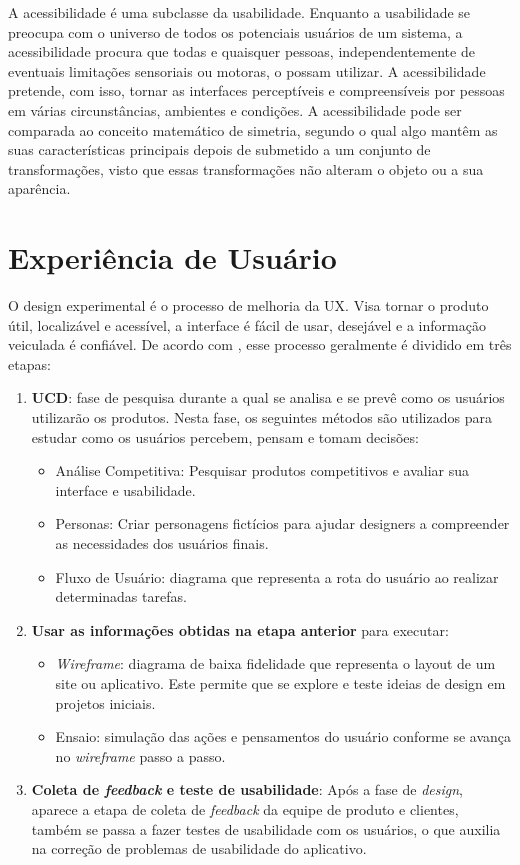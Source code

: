A acessibilidade é uma subclasse da usabilidade. Enquanto a usabilidade se preocupa com o universo de todos os potenciais usuários de um sistema, a acessibilidade procura que todas e quaisquer pessoas, independentemente de eventuais limitações sensoriais ou motoras, o possam utilizar. A acessibilidade pretende, com isso, tornar as interfaces perceptíveis e compreensíveis por pessoas em várias circunstâncias, ambientes e condições. A acessibilidade pode ser comparada ao conceito matemático de simetria, segundo o qual algo mantêm as suas características principais depois de submetido a um conjunto de transformações, visto que essas transformações não alteram o objeto ou a sua aparência. \cite{matos2021estudo} 
 
\section{Experiência de Usuário}
\label{Experiência_de_Usuário}

O design experimental é o processo de melhoria da \acf{UX}. Visa tornar o produto útil, localizável e acessível, a interface é fácil de usar, desejável e a informação veiculada é confiável. De acordo com \cite{brito2016usabilidade}, esse processo geralmente é dividido em três etapas:

\begin{enumerate}
    \item \textbf{\ac{UCD}}: fase de pesquisa durante a qual se analisa e se prevê como os usuários utilizarão os produtos. Nesta fase, os seguintes métodos são utilizados para estudar como os usuários percebem, pensam e tomam decisões:
    \begin{itemize}
        \item Análise Competitiva: Pesquisar produtos competitivos e avaliar sua interface e usabilidade. 
        \item Personas: Criar personagens fictícios para ajudar designers a compreender as necessidades dos usuários finais. 
        \item Fluxo de Usuário: diagrama que representa a rota do usuário ao realizar determinadas tarefas. 
    \end{itemize}
   \item \textbf{Usar as informações obtidas na etapa anterior} para executar:
    \begin{itemize}
        \item \textit{Wireframe}: diagrama de baixa fidelidade que representa o layout de um site ou aplicativo. Este permite que se explore e teste ideias de design em projetos iniciais. 
        \item Ensaio: simulação das ações e pensamentos do usuário conforme se avança no \textit{wireframe} passo a passo.
    \end{itemize}
   \item \textbf{Coleta de \textit{feedback} e teste de usabilidade}: Após a fase de \textit{design}, aparece a etapa de coleta de \textit{feedback} da equipe de produto e clientes, também se passa a fazer testes de usabilidade com os usuários, o que auxilia na correção de problemas de usabilidade do aplicativo.
\end{enumerate}

